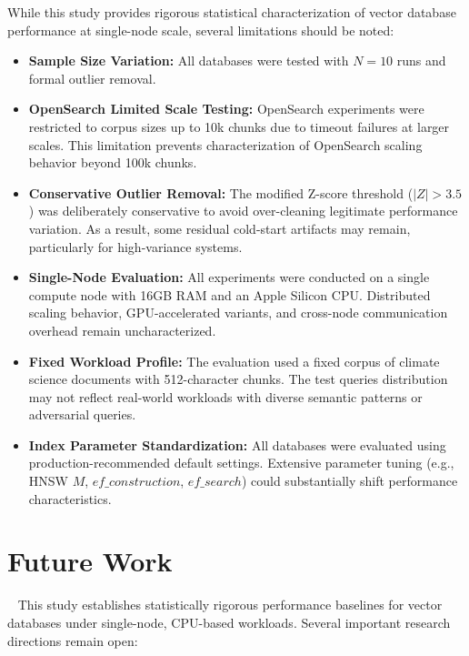 \documentclass{article}
\begin{document}
While this study provides rigorous statistical characterization of vector database performance at single-node scale, several limitations should be noted:

\begin{itemize}
    \item \textbf{Sample Size Variation:}  
    All databases were tested with $N=10$ runs and formal outlier removal. 

    \item \textbf{OpenSearch Limited Scale Testing:}  
    OpenSearch experiments were restricted to corpus sizes up to 10k chunks due to timeout failures at larger scales. This limitation prevents characterization of OpenSearch scaling behavior beyond 100k chunks.

    \item \textbf{Conservative Outlier Removal:}  
    The modified Z-score threshold ($|Z| > 3.5$) was deliberately conservative to avoid over-cleaning legitimate performance variation. As a result, some residual cold-start artifacts may remain, particularly for high-variance systems.

    \item \textbf{Single-Node Evaluation:}  
    All experiments were conducted on a single compute node with 16GB RAM and an Apple Silicon CPU. Distributed scaling behavior, GPU-accelerated variants, and cross-node communication overhead remain uncharacterized.

    \item \textbf{Fixed Workload Profile:}  
    The evaluation used a fixed corpus of climate science documents with 512-character chunks. The test queries distribution  may not reflect real-world workloads with diverse semantic patterns or adversarial queries.

    \item \textbf{Index Parameter Standardization:}  
    All databases were evaluated using production-recommended default settings. Extensive parameter tuning (e.g., HNSW $M$, $ef\_construction$, $ef\_search$) could substantially shift performance characteristics.

   
\end{itemize}


\section{Future Work}
~\label{sec: future} 
This study establishes statistically rigorous performance baselines for vector databases under single-node, CPU-based workloads. Several important research directions remain open:
\end{document}
